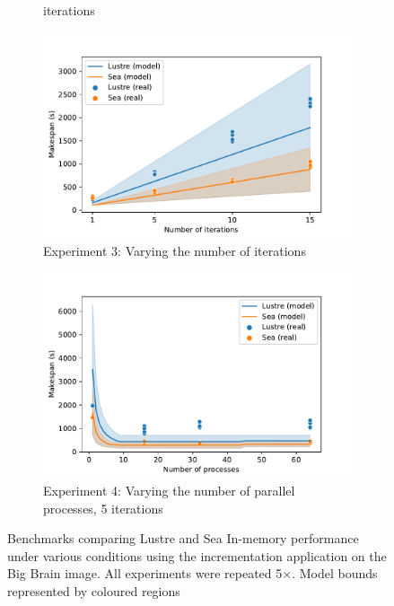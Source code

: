 \documentclass[10pt,journal,compsoc]{IEEEtran}
\begin{document}
\begin{figure}
\begin{subfigure}{\columnwidth}
{        iterations}\label{fig:sea-comp:disks}
    \end{subfigure}
    \begin{subfigure}{\columnwidth}
        \centering
        \captionsetup{width=.85\linewidth}
        \includegraphics[width=\linewidth]{figures/iterations.pdf}
        \caption{Experiment 3: Varying the number of
        iterations}\label{fig:sea-comp:iterations}
    \end{subfigure}
    \begin{subfigure}{\columnwidth}
        \centering
        \captionsetup{width=.85\linewidth}
        \includegraphics[width=\linewidth]{figures/threads.pdf}
        \caption{Experiment 4: Varying the number of parallel processes, 5
        iterations}\label{fig:sea-comp:processes}
    \end{subfigure}
    \caption{Benchmarks comparing Lustre and Sea In-memory performance under
    various conditions using the incrementation application on the Big Brain
    image. All experiments were repeated 5$\times$. Model bounds represented by coloured regions}
    \label{fig:sea-comp:benchmarks}
    \end{figure}
\end{document}
